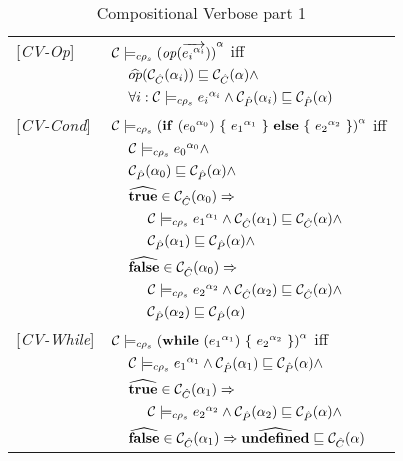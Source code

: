 \begin{table}
\begin{tabular}{l l l l}
{[\textit{CV-Op}]}&\multicolumn{3}{l}{$ \ccestl {\op (\vec{\lbt i})} $ iff}\\
&&\multicolumn{2}{l}{$\widehat{op} (\Cat(\all_i)) \sqsubseteq \Cat(\all) \wedge$}\\
&&\multicolumn{2}{l}{$\forall i : \ccest {\lbt i} \wedge \Pat(\all_i) \sqsubseteq \Pat(\all)  $}\\
{[\textit{CV-Cond}]}&\multicolumn{3}{l}{$\ccestl{\cond {\lbt 0} {\lbt 1} {\lbt 2}} $ iff}\\
&&\multicolumn{2}{l}{$ \ccest {\lbt 0} \wedge $}\\
&&\multicolumn{2}{l}{$\Pat(\all_0) \sqsubseteq \Pat(\all) \wedge$} \\
&&\multicolumn{2}{l}{$\widehat{\true} \in \Cat(\all_0) \Rightarrow$}\\
&&&$\ccest {\lbt 1} \wedge \Cat(\all_1) \sqsubseteq \Cat(\all)\wedge$\\
&&&$\Pat(\all_1) \sqsubseteq \Pat(\all) \wedge$ \\
&&\multicolumn{2}{l}{$\widehat{\false} \in \Cat(\all_0) \Rightarrow$}\\
&&&$\ccest {\lbt 2} \wedge \Cat(\all_2) \sqsubseteq \Cat(\all) \wedge$\\
&&&$\Pat(\all_2) \sqsubseteq \Pat(\all)$ \\
{[\textit{CV-While}]}&\multicolumn{3}{l}{$\ccestl {\while {\lbt 1} {\lbt 2}} $ iff}\\
&&\multicolumn{2}{l}{$ \ccest {\lbt 1} \wedge \Pat(\all_1) \sqsubseteq \Pat(\all) \wedge$}\\
&&\multicolumn{2}{l}{$\widehat{\true} \in \Cat(\all_1) \Rightarrow$}\\
&&&$\ccest {\lbt 2} \wedge \Pat(\all_2) \sqsubseteq \Pat(\all)\wedge$\\
&&\multicolumn{2}{l}{$\widehat{\false} \in \Cat(\all_1) \Rightarrow \widehat{\undef} \sqsubseteq \Cat(\all)$}\\
\end{tabular}
\caption{Compositional Verbose part 1}
\label{tab:CompVerb1}
\end{table}

